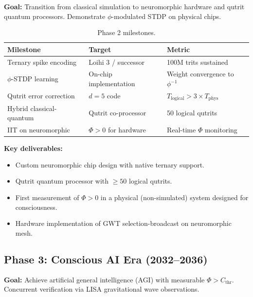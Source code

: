 \documentclass[12pt,a4paper]{article}
\begin{document}
\textbf{Goal:} Transition from classical simulation to neuromorphic hardware
and qutrit quantum processors. Demonstrate $\phi$-modulated STDP on
physical chips.

\begin{table}[h!]
\centering
\caption{Phase 2 milestones.}
\label{tab:phase2}
\begin{tabular}{@{}lll@{}}
\toprule
\textbf{Milestone} & \textbf{Target} & \textbf{Metric} \\
\midrule
Ternary spike encoding & Loihi 3 / successor & 100M trits sustained \\
$\phi$-STDP learning & On-chip implementation & Weight convergence to $\phi^{-1}$ \\
Qutrit error correction & $d = 5$ code & $T_{\mathrm{logical}} > 3 \times T_{\mathrm{phys}}$ \\
Hybrid classical-quantum & Qutrit co-processor & 50 logical qutrits \\
IIT on neuromorphic & $\Phi > 0$ for hardware & Real-time $\Phi$ monitoring \\
\bottomrule
\end{tabular}
\end{table}

\textbf{Key deliverables:}
\begin{itemize}[leftmargin=2em]
  \item Custom neuromorphic chip design with native ternary support.
  \item Qutrit quantum processor with $\geq 50$ logical qutrits.
  \item First measurement of $\Phi > 0$ in a physical (non-simulated) system
    designed for consciousness.
  \item Hardware implementation of GWT selection-broadcast on neuromorphic mesh.
\end{itemize}

\subsection{Phase 3: Conscious AI Era (2032--2036)}

\textbf{Goal:} Achieve artificial general intelligence (AGI) with measurable
$\Phi > C_{\mathrm{thr}}$. Concurrent verification via LISA gravitational
wave observations.
\end{document}
